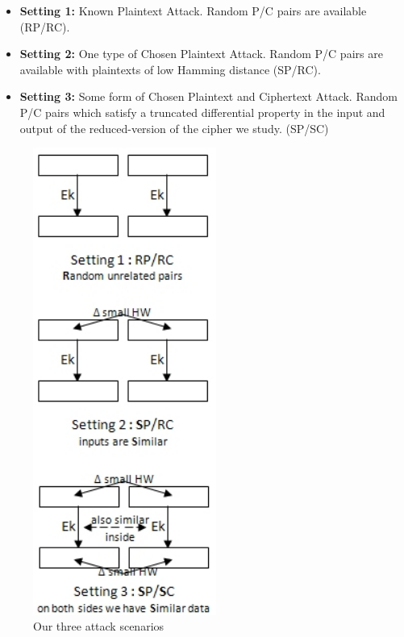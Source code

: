 \begin{itemize}
	\item \textbf{Setting 1:}  Known Plaintext Attack. Random P/C pairs are available (RP/RC). 
	\item \textbf{Setting 2:} One type of Chosen Plaintext Attack.  Random P/C pairs are available with plaintexts of low Hamming distance (SP/RC).
	\item \textbf{Setting 3:} Some form of Chosen Plaintext and Ciphertext Attack. Random P/C pairs which satisfy a truncated differential property in the input and output of the reduced-version of the cipher we study.  (SP/SC) %
\end{itemize}

\begin{figure}[!h]
	\vspace{-0.2cm}
	\centering
	\includegraphics*[width=60mm]{./pics/three_scenarios2.jpg}
	\caption{Our three attack scenarios}
	\label{ThreeScenarios}
	\vspace{-0.1cm}
\end{figure}



